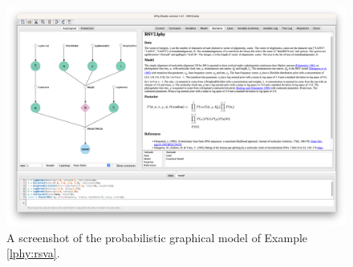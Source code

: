 \documentclass[12pt]{article} %
\begin{document}

\begin{figure}
  \includegraphics[width=\textwidth]{figs_plos/RSV2.tiff} 
  \caption{A screenshot of the probabilistic graphical model of Example \ref{lphy:rsva}.} 
  \label{fig:RSV2PGM}
\end{figure}


\clearpage


\bigskip












\end{document}
